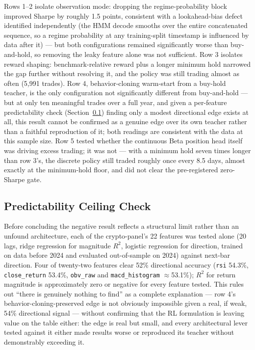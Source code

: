 Rows 1--2 isolate observation mode: dropping the regime-probability block improved Sharpe by roughly 1.5 points, consistent with a lookahead-bias defect identified independently (the HMM decode smooths over the entire concatenated sequence, so a regime probability at any training-split timestamp is influenced by data after it) --- but both configurations remained significantly worse than buy-and-hold, so removing the leaky feature alone was not sufficient. Row 3 isolates reward shaping: benchmark-relative reward plus a longer minimum hold narrowed the gap further without resolving it, and the policy was still trading almost as often (5{,}991 trades). Row 4, behavior-cloning warm-start from a buy-hold teacher, is the only configuration not significantly different from buy-and-hold --- but at only ten meaningful trades over a full year, and given a per-feature predictability check (Section~\ref{subsec:rl-ceiling-check}) finding only a modest directional edge exists at all, this result cannot be confirmed as a genuine edge over its own teacher rather than a faithful reproduction of it; both readings are consistent with the data at this sample size. Row 5 tested whether the continuous Beta position head itself was driving excess trading; it was not --- with a minimum hold seven times longer than row 3's, the discrete policy still traded roughly once every 8.5 days, almost exactly at the minimum-hold floor, and did not clear the pre-registered zero-Sharpe gate.

\subsection{Predictability Ceiling Check}
\label{subsec:rl-ceiling-check}

Before concluding the negative result reflects a structural limit rather than an unfound architecture, each of the crypto-panel's 22 features was tested alone (20 lags, ridge regression for magnitude $R^2$, logistic regression for direction, trained on data before 2024 and evaluated out-of-sample on 2024) against next-bar direction. Four of twenty-two features clear 52\% directional accuracy (\texttt{rsi} 54.3\%, \texttt{close\_return} 53.4\%, \texttt{obv\_raw} and \texttt{macd\_histogram} $\approx$53.1\%); $R^2$ for return magnitude is approximately zero or negative for every feature tested. This rules out ``there is genuinely nothing to find'' as a complete explanation --- row 4's behavior-cloning-preserved edge is not obviously impossible given a real, if weak, 54\% directional signal --- without confirming that the RL formulation is leaving value on the table either: the edge is real but small, and every architectural lever tested against it either made results worse or reproduced its teacher without demonstrably exceeding it.

